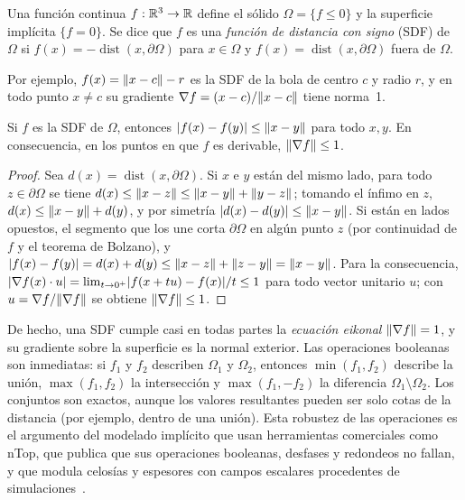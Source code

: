 \begin{definicion}\label{def:sdf}
Una función continua $f:\mathbb{R}^3\to\mathbb{R}$ define el sólido $\Omega=\{f\le 0\}$ y la superficie implícita $\{f=0\}$. Se dice que $f$ es una \emph{función de distancia con signo} (SDF) de $\Omega$ si $f(x)=-\operatorname{dist}(x,\partial\Omega)$ para $x\in\Omega$ y $f(x)=\operatorname{dist}(x,\partial\Omega)$ fuera de $\Omega$.
\end{definicion}

Por ejemplo, $f(x)=\lVert x-c\rVert-r$ es la SDF de la bola de centro $c$ y radio $r$, y en todo punto $x\ne c$ su gradiente $\nabla f=(x-c)/\lVert x-c\rVert$ tiene norma~1.

\begin{proposicion}\label{prop:lipschitz}
Si $f$ es la SDF de $\Omega$, entonces $\lvert f(x)-f(y)\rvert\le\lVert x-y\rVert$ para todo $x,y$. En consecuencia, en los puntos en que $f$ es derivable, $\lVert\nabla f\rVert\le 1$.
\end{proposicion}

\begin{proof}
Sea $d(x)=\operatorname{dist}(x,\partial\Omega)$. Si $x$ e $y$ están del mismo lado, para todo $z\in\partial\Omega$ se tiene $d(x)\le\lVert x-z\rVert\le\lVert x-y\rVert+\lVert y-z\rVert$; tomando el ínfimo en $z$, $d(x)\le\lVert x-y\rVert+d(y)$, y por simetría $\lvert d(x)-d(y)\rvert\le\lVert x-y\rVert$. Si están en lados opuestos, el segmento que los une corta $\partial\Omega$ en algún punto $z$ (por continuidad de $f$ y el teorema de Bolzano), y $\lvert f(x)-f(y)\rvert=d(x)+d(y)\le\lVert x-z\rVert+\lVert z-y\rVert=\lVert x-y\rVert$. Para la consecuencia, $\lvert\nabla f(x)\cdot u\rvert=\lim_{t\to 0^+}\lvert f(x+tu)-f(x)\rvert/t\le 1$ para todo vector unitario $u$; con $u=\nabla f/\lVert\nabla f\rVert$ se obtiene $\lVert\nabla f\rVert\le 1$.
\end{proof}

De hecho, una SDF cumple casi en todas partes la \emph{ecuación eikonal} $\lVert\nabla f\rVert=1$, y su gradiente sobre la superficie es la normal exterior. Las operaciones booleanas son inmediatas: si $f_1$ y $f_2$ describen $\Omega_1$ y $\Omega_2$, entonces $\min(f_1,f_2)$ describe la unión, $\max(f_1,f_2)$ la intersección y $\max(f_1,-f_2)$ la diferencia $\Omega_1\setminus\Omega_2$. Los conjuntos son exactos, aunque los valores resultantes pueden ser solo cotas de la distancia (por ejemplo, dentro de una unión). Esta robustez de las operaciones es el argumento del modelado implícito que usan herramientas comerciales como nTop, que publica que sus operaciones booleanas, desfases y redondeos no fallan, y que modula celosías y espesores con campos escalares procedentes de simulaciones~\cite{ntop}.

